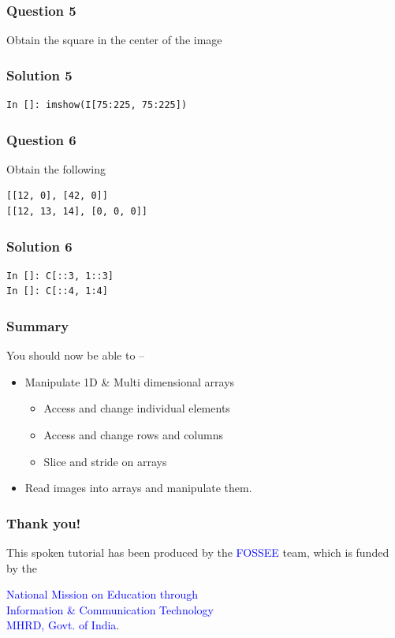 \documentclass[presentation]{beamer}
\begin{document}
\begin{frame}
\frametitle{Question 5}
\label{sec-12}

  Obtain the square in the center of the image
\end{frame}
\begin{frame}[fragile]
\frametitle{Solution 5}
\label{sec-13}

\lstset{language=Python}
\begin{lstlisting}
In []: imshow(I[75:225, 75:225])
\end{lstlisting}
\end{frame}
\begin{frame}[fragile]
\frametitle{Question 6}
\label{sec-14}

  Obtain the following
\lstset{language=Python}
\begin{lstlisting}
[[12, 0], [42, 0]]
[[12, 13, 14], [0, 0, 0]]
\end{lstlisting}
\end{frame}
\begin{frame}[fragile]
\frametitle{Solution 6}
\label{sec-15}

\lstset{language=Python}
\begin{lstlisting}
In []: C[::3, 1::3]
In []: C[::4, 1:4]
\end{lstlisting}
\end{frame}
\begin{frame}
\frametitle{Summary}
\label{sec-16}

  You should now be able to --
\begin{itemize}
\item Manipulate 1D \& Multi dimensional arrays

\begin{itemize}
\item Access and change individual elements
\item Access and change rows and columns
\item Slice and stride on arrays
\end{itemize}

\item Read images into arrays and manipulate them.
\end{itemize}
\end{frame}
\begin{frame}
\frametitle{Thank you!}
\label{sec-17}

  \begin{block}{}
  \begin{center}
  This spoken tutorial has been produced by the
  \textcolor{blue}{FOSSEE} team, which is funded by the 
  \end{center}
  \begin{center}
    \textcolor{blue}{National Mission on Education through \\
      Information \& Communication Technology \\ 
      MHRD, Govt. of India}.
  \end{center}  
  \end{block}
\end{frame}
\end{document}
